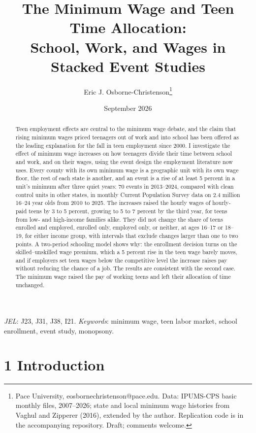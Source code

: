 \documentclass[12pt]{article}
\title{The Minimum Wage and Teen Time Allocation:\\ School, Work, and Wages in Stacked Event Studies}
\author{Eric J. Osborne-Christenson\thanks{Pace University, eosbornechristenson@pace.edu. Data: IPUMS-CPS basic monthly files, 2007--2026; state and local minimum wage histories from Vaghul and Zipperer (2016), extended by the author. Replication code is in the accompanying repository. Draft; comments welcome.}}
\date{September 2026}
\begin{document}
\maketitle

\begin{abstract}
\noindent Teen employment effects are central to the minimum wage debate, and the claim that rising minimum wages priced teenagers out of work and into school has been offered as the leading explanation for the fall in teen employment since 2000. I investigate the effect of minimum wage increases on how teenagers divide their time between school and work, and on their wages, using the event design the employment literature now uses. Every county with its own minimum wage is a geographic unit with its own wage floor, the rest of each state is another, and an event is a rise of at least 5 percent in a unit's minimum after three quiet years: 70 events in 2013--2024, compared with clean control units in other states, in monthly Current Population Survey data on 2.4 million 16--24 year olds from 2010 to 2025. The increases raised the hourly wages of hourly-paid teens by 3 to 5 percent, growing to 5 to 7 percent by the third year, for teens from low- and high-income families alike. They did not change the share of teens enrolled and employed, enrolled only, employed only, or neither, at ages 16--17 or 18--19, for either income group, with intervals that exclude changes larger than one to two points. A two-period schooling model shows why: the enrollment decision turns on the skilled--unskilled wage premium, which a 5 percent rise in the teen wage barely moves, and if employers set teen wages below the competitive level the increase raises pay without reducing the chance of a job. The results are consistent with the second case. The minimum wage raised the pay of working teens and left their allocation of time unchanged.
\end{abstract}

\noindent\textit{JEL}: J23, J31, J38, I21. \textit{Keywords}: minimum wage, teen labor market, school enrollment, event study, monopsony.

\section{1 Introduction}
\end{document}
